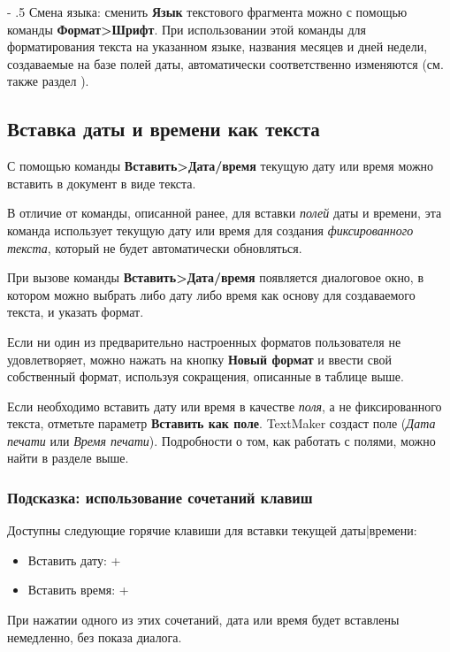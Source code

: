 ﻿\documentclass[a4paper,10pt]{article}
\makeatletter
\renewcommand\paragraph{%
   \@startsection{paragraph}{4}{0mm}%
      {-\baselineskip}%
      {.5\baselineskip}%
      {\normalfont\normalsize\bfseries}}
\makeatother
\begin{document}
\paragraph{Смена языка:} сменить \textbf{Язык} текстового фрагмента можно с помощью команды \textbf{Формат>Шрифт}. При использовании этой команды для форматирования текста на указанном языке, названия месяцев и дней недели, создаваемые на базе полей даты, автоматически соответственно изменяются (см. также раздел ).

\subsection{Вставка даты и времени как текста}
С помощью команды \textbf{Вставить>Дата/время} текущую дату или время можно вставить в документ в виде текста.

В отличие от команды, описанной ранее, для вставки \textit{полей} даты и времени, эта команда использует текущую дату или время для создания \textit{фиксированного текста}, который не будет автоматически обновляться.

При вызове команды \textbf{Вставить>Дата/время} появляется диалоговое окно, в котором можно выбрать либо дату либо время как основу для создаваемого текста, и указать формат.

Если ни один из предварительно настроенных форматов пользователя не удовлетворяет, можно нажать на кнопку \textbf{Новый формат} и ввести свой собственный формат, используя сокращения, описанные в таблице выше.

Если необходимо вставить дату или время в качестве \textit{поля}, а не фиксированного текста, отметьте параметр \textbf{Вставить как поле}. TextMaker создаст поле (\textit{Дата печати} или \textit{Время печати}). Подробности о том, как работать с полями, можно найти в разделе выше.

\subsubsection{Подсказка: использование сочетаний клавиш}
Доступны следующие горячие клавиши для вставки текущей даты|времени:
\begin{itemize}
 \item Вставить дату: +
 \item Вставить время: +\keys{:}
\end{itemize}

При нажатии одного из этих сочетаний, дата или время будет вставлены немедленно, без показа диалога.
\end{document}
